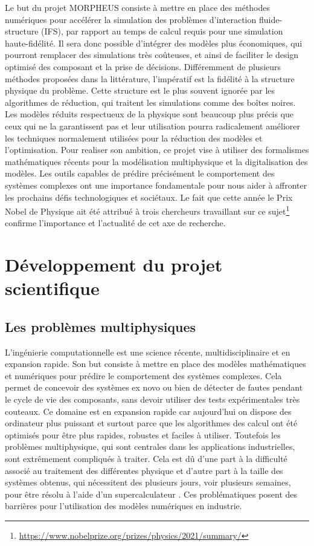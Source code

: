 \documentclass[12pt, french]{article}
\begin{document}
Le but du projet MORPHEUS consiste à mettre en place des méthodes numériques
pour accélérer la simulation des problèmes d'interaction fluide-structure (IFS), par rapport au temps de calcul requis pour une simulation haute-fidélité. Il sera donc possible d'intégrer des modèles plus économiques, qui pourront remplacer des simulations très coûteuses, et ainsi de faciliter le design optimisé des composant et la prise de décisions. Différemment de plusieurs méthodes proposées dans la littérature, l'impératif est la fidélité à la structure physique du problème.  Cette structure est le plus souvent ignorée par les algorithmes de réduction, qui traitent les simulations comme des boîtes noires. Les modèles réduits respectueux de la physique sont beaucoup plus précis que ceux qui ne la garantissent pas et leur utilisation pourra radicalement améliorer les techniques normalement utilisées pour la réduction des modèles et l'optimisation. Pour realiser son ambition, ce projet vise à utiliser des formalismes mathématiques récents pour la modélisation multiphysique et la digitalisation des modèles. Les outils capables de prédire précisément le comportement des systèmes complexes ont une importance fondamentale pour nous aider à affronter les prochains défis technologiques et sociétaux. Le fait que cette année le Prix Nobel de Physique ait été attribué à trois chercheurs travaillant sur ce sujet\footnote{\url{https://www.nobelprize.org/prizes/physics/2021/summary/}} confirme
l'importance et l'actualité de cet axe de recherche.


\section{Développement du projet scientifique}

\subsection{Les problèmes multiphysiques}
L'ingénierie computationnelle est une science récente, multidisciplinaire et en expansion rapide. Son but consiste à mettre en place des modèles mathématiques et numériques pour prédire le comportement des systèmes complexes. Cela permet de concevoir des systèmes ex novo ou bien de détecter de fautes pendant le cycle de vie des composants, sans devoir utiliser des tests expérimentales très couteaux. Ce domaine est en expansion rapide car aujourd'hui on dispose des ordinateur plus puissant et surtout parce que les algorithmes des calcul ont été optimisés pour être plus rapides, robustes et faciles à utiliser. Toutefois les problèmes multiphysique, qui sont centrales dans les applications industrielles, sont extrêmement compliqués à traiter. Cela est d\^u d'une part à la difficulté associé au traitement des différentes physique et d'autre part à la taille des systèmes obtenus, qui nécessitent des plusieurs jours, voir plusieurs semaines, pour être résolu à l'aide d'un supercalculateur \cite{keyes2013}. Ces problématiques posent des barrières pour l'utilisation des modèles numériques en industrie. 
\end{document}
